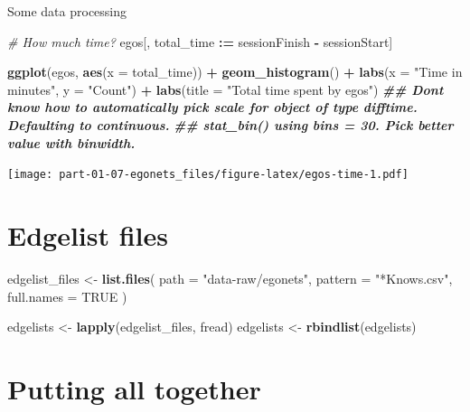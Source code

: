 \documentclass[
]{book}
\newenvironment{Shaded}{\begin{snugshade}}{\end{snugshade}}
\newcommand{\AttributeTok}[1]{\textcolor[rgb]{0.13,0.29,0.53}{#1}}
\newcommand{\CommentTok}[1]{\textcolor[rgb]{0.56,0.35,0.01}{\textit{#1}}}
\newcommand{\ConstantTok}[1]{\textcolor[rgb]{0.56,0.35,0.01}{#1}}
\newcommand{\DocumentationTok}[1]{\textcolor[rgb]{0.56,0.35,0.01}{\textbf{\textit{#1}}}}
\newcommand{\FunctionTok}[1]{\textcolor[rgb]{0.13,0.29,0.53}{\textbf{#1}}}
\newcommand{\NormalTok}[1]{#1}
\newcommand{\OtherTok}[1]{\textcolor[rgb]{0.56,0.35,0.01}{#1}}
\newcommand{\SpecialCharTok}[1]{\textcolor[rgb]{0.81,0.36,0.00}{\textbf{#1}}}
\newcommand{\StringTok}[1]{\textcolor[rgb]{0.31,0.60,0.02}{#1}}
\begin{document}
Some data processing

\begin{Shaded}
\begin{Highlighting}[]
\CommentTok{\# How much time?}
\NormalTok{egos[, total\_time }\SpecialCharTok{:=}\NormalTok{ sessionFinish }\SpecialCharTok{{-}}\NormalTok{ sessionStart]}

\FunctionTok{ggplot}\NormalTok{(egos, }\FunctionTok{aes}\NormalTok{(}\AttributeTok{x =}\NormalTok{ total\_time)) }\SpecialCharTok{+}
  \FunctionTok{geom\_histogram}\NormalTok{() }\SpecialCharTok{+}
  \FunctionTok{labs}\NormalTok{(}\AttributeTok{x =} \StringTok{"Time in minutes"}\NormalTok{, }\AttributeTok{y =} \StringTok{"Count"}\NormalTok{) }\SpecialCharTok{+}
  \FunctionTok{labs}\NormalTok{(}\AttributeTok{title =} \StringTok{"Total time spent by egos"}\NormalTok{)}
\DocumentationTok{\#\# Don\textquotesingle{}t know how to automatically pick scale for object of type difftime. Defaulting to continuous.}
\DocumentationTok{\#\# \textasciigrave{}stat\_bin()\textasciigrave{} using \textasciigrave{}bins = 30\textasciigrave{}. Pick better value with \textasciigrave{}binwidth\textasciigrave{}.}
\end{Highlighting}
\end{Shaded}

\texttt{[image: part-01-07-egonets\_files/figure-latex/egos-time-1.pdf]}

\hypertarget{edgelist-files}{%
\section{Edgelist files}\label{edgelist-files}}

\begin{Shaded}
\begin{Highlighting}[]
\NormalTok{edgelist\_files }\OtherTok{\textless{}{-}} \FunctionTok{list.files}\NormalTok{(}
  \AttributeTok{path =} \StringTok{"data{-}raw/egonets"}\NormalTok{,}
  \AttributeTok{pattern =} \StringTok{"*Knows.csv"}\NormalTok{,}
  \AttributeTok{full.names =} \ConstantTok{TRUE}
\NormalTok{  )}

\NormalTok{edgelists }\OtherTok{\textless{}{-}} \FunctionTok{lapply}\NormalTok{(edgelist\_files, fread)}
\NormalTok{edgelists }\OtherTok{\textless{}{-}} \FunctionTok{rbindlist}\NormalTok{(edgelists)}
\end{Highlighting}
\end{Shaded}

\hypertarget{putting-all-together}{%
\section{Putting all together}\label{putting-all-together}}
\end{document}
